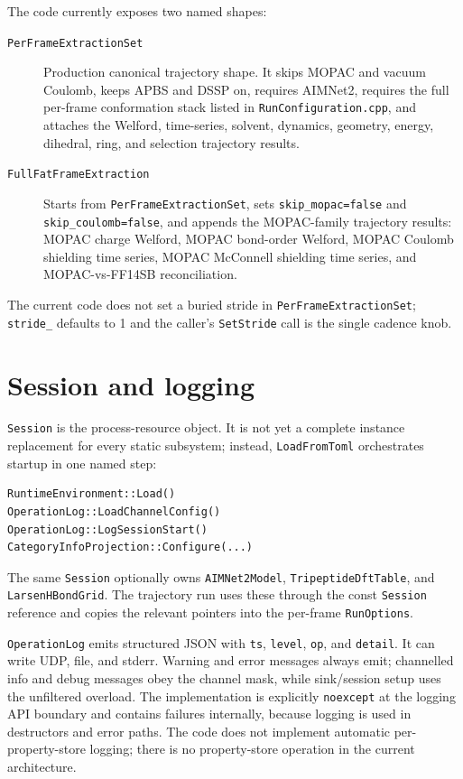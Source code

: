 \documentclass[11pt]{article}
\newcommand{\code}[1]{\texttt{#1}}
\begin{document}
The code currently exposes two named shapes:

\begin{description}
\item[\code{PerFrameExtractionSet}] Production canonical trajectory shape.
It skips MOPAC and vacuum Coulomb, keeps APBS and DSSP on, requires AIMNet2,
requires the full per-frame conformation stack listed in
\code{RunConfiguration.cpp}, and attaches the Welford, time-series, solvent,
dynamics, geometry, energy, dihedral, ring, and selection trajectory results.

\item[\code{FullFatFrameExtraction}] Starts from \code{PerFrameExtractionSet},
sets \code{skip\_mopac=false} and \code{skip\_coulomb=false}, and appends the
MOPAC-family trajectory results: MOPAC charge Welford, MOPAC bond-order
Welford, MOPAC Coulomb shielding time series, MOPAC McConnell shielding time
series, and MOPAC-vs-FF14SB reconciliation.
\end{description}

The current code does not set a buried stride in
\code{PerFrameExtractionSet}; \code{stride\_} defaults to 1 and the caller's
\code{SetStride} call is the single cadence knob.

\section{Session and logging}

\code{Session} is the process-resource object. It is not yet a complete
instance replacement for every static subsystem; instead,
\code{LoadFromToml} orchestrates startup in one named step:

\begin{lstlisting}
RuntimeEnvironment::Load()
OperationLog::LoadChannelConfig()
OperationLog::LogSessionStart()
CategoryInfoProjection::Configure(...)
\end{lstlisting}

The same \code{Session} optionally owns \code{AIMNet2Model},
\code{TripeptideDftTable}, and \code{LarsenHBondGrid}. The trajectory run uses
these through the const \code{Session} reference and copies the relevant
pointers into the per-frame \code{RunOptions}.

\code{OperationLog} emits structured JSON with \code{ts}, \code{level},
\code{op}, and \code{detail}. It can write UDP, file, and stderr. Warning and
error messages always emit; channelled info and debug messages obey the channel
mask, while sink/session setup uses the unfiltered overload.
The implementation is explicitly \code{noexcept} at the logging API boundary
and contains failures internally, because logging is used in destructors and
error paths. The code does not implement automatic per-property-store logging;
there is no property-store operation in the current architecture.
\end{document}
